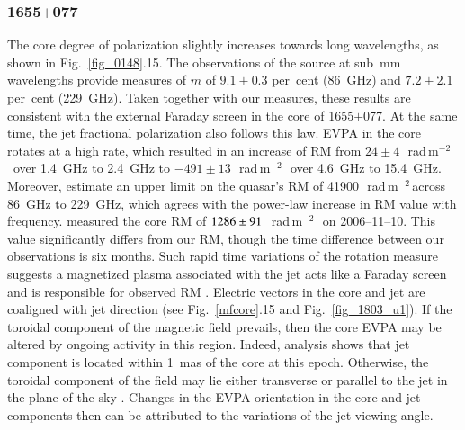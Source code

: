 \documentclass[a4paper,fleqn,usenatbib,useAMS]{mnras}
\newcommand{\rmu}{\,rad\,m$^{-2}$\,} %
\begin{document}
\subsubsection{1655$+$077}
The core degree of polarization slightly increases towards long wavelengths, as shown in Fig.~\ref{fig_0148}.15.
The observations of the source at sub~mm wavelengths \citep{agudo_etal14} provide measures of $m$ of $9.1\pm0.3$ per~cent (86~GHz) and $7.2\pm2.1$ per~cent (229~GHz).
Taken together with our measures, these results are consistent with the external Faraday screen in the core of 1655$+$077.
At the same time, the jet fractional polarization also follows this law.
EVPA in the core rotates at a high rate, which resulted in an increase of RM from $24\pm4$~\rmu\ over 1.4~GHz to 2.4~GHz to $-491\pm13$~\rmu\ over 4.6~GHz to 15.4~GHz. 
Moreover, \citeauthor{agudo_etal14} estimate an upper limit on the quasar's RM of 41900~\rmu across 86~GHz to 229~GHz, which agrees with the power-law increase in RM value with frequency.
\citet{hovatta_etal12} measured the core RM of $\-1286\pm91$~\rmu\ on 2006--11--10.
This value significantly differs from our RM, though the time difference between our observations is six months. Such rapid time variations of the rotation measure suggests a magnetized plasma associated with the jet acts like a Faraday screen and is responsible for observed RM \citep[see, e.g.][]{asada_etal08}.
Electric vectors in the core and jet are coaligned with jet direction (see Fig.~\ref{mfcore}.15 and Fig.~\ref{fig_1803_u1}). 
If the toroidal component of the magnetic field prevails, then the core EVPA may be altered by ongoing activity in this region.
Indeed, \citet{2016AJ....152...12L} analysis shows that jet component is located within 1~mas of the core at this epoch.
Otherwise, the toroidal component of the field may lie either transverse or parallel to the jet in the plane of the sky \citep{lyutikov_etal05}.
Changes in the EVPA orientation in the core and jet components then can be attributed to the variations of the jet viewing angle.
\end{document}
